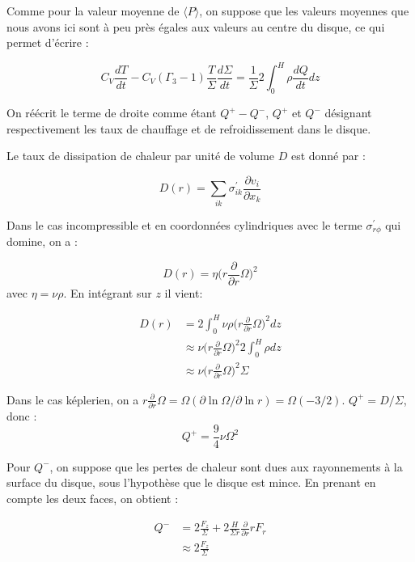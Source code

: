 \documentclass[a4paper,12pt]{article}
\newcommand{\derivr}[1]{\frac{\partial}{\partial r} #1}
\begin{document}
Comme pour la valeur moyenne de $\langle P \rangle$, on suppose que les valeurs moyennes que nous avons ici sont à peu près égales aux valeurs au centre du disque, ce qui permet d'écrire :

\begin{equation}
\label{equation thermique}
    C_V \frac{dT}{dt}-C_V(\Gamma_3-1)\frac{T}{\Sigma}\frac{d\Sigma}{dt}= \frac{1}{\Sigma}2 \int_0^H \rho \frac{dQ}{dt}dz
\end{equation}

On réécrit le terme de droite comme étant $Q^+-Q^-$, $Q^+$ et $Q^-$ désignant respectivement les taux de chauffage et de refroidissement dans le disque.

Le taux de dissipation de chaleur par unité de volume $D$ est donné par :

\begin{equation*}
    D(r)=\sum_{ik}\sigma_{ik}^{'}\frac{\partial v_i}{\partial x_k}
\end{equation*}

Dans le cas incompressible et en coordonnées cylindriques avec le terme $\sigma_{r \phi}^{'}$ qui domine, on a :

\begin{equation*}
    D(r)=\eta \Big( r\derivr{\Omega} \Big)^2
\end{equation*}
avec $\eta=\nu \rho$. En intégrant sur $z$ il vient:

\begin{equation*}
    \begin{split}
        D(r) &=2\int_0^H \nu \rho \Big( r\derivr{\Omega} \Big)^2 dz\\
        & \approx \nu \Big( r\derivr{\Omega} \Big)^2 2 \int_0^H \rho dz\\
        & \approx \nu \Big( r\derivr{\Omega} \Big)^2 \Sigma
    \end{split}
\end{equation*}

Dans le cas képlerien, on a $r\derivr{\Omega}=\Omega (\partial \ln \Omega/ \partial \ln r)=\Omega (-3/2)$.
$Q^+=D/\Sigma$, donc :
\begin{equation*}
    Q^+=\frac{9}{4}\nu \Omega^2
\end{equation*}

Pour $Q^-$, on suppose que les pertes de chaleur sont dues aux rayonnements à la surface du disque, sous l'hypothèse que le disque est mince. En prenant en compte les deux faces, on obtient :

\begin{equation}
    \begin{split}
        Q^- &= 2 \frac{F_z}{\Sigma}+2\frac{H}{\Sigma r}\derivr{r}F_r\\
        &\approx 2\frac{F_z}{\Sigma}
    \end{split}
\end{equation}
\end{document}
